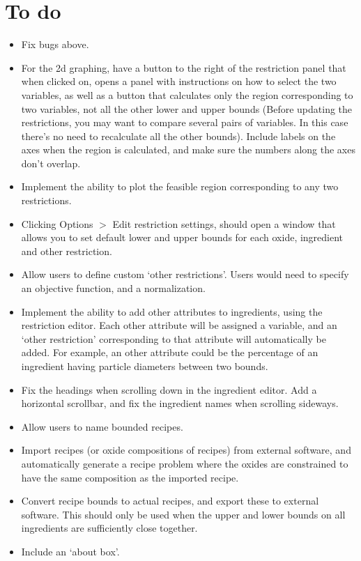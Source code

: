 \documentclass[a4paper,10pt]{article}
\begin{document}
\section{To do}
\begin{itemize}
\item Fix bugs above.
\item For the 2d graphing, have a button to the right of the restriction panel that when clicked on, opens a panel with instructions on how to select the two variables, as well as a button that calculates only the region corresponding to two variables, not all the other lower and upper bounds (Before updating the restrictions, you may want to compare several pairs of variables. In this case there's no need to recalculate all the other bounds). Include labels on the axes when the region is calculated, and make sure the numbers along the axes don't overlap. 
\item Implement the ability to plot the feasible region corresponding to any two restrictions.
\item Clicking Options $>$ Edit restriction settings, should open a window that allows you to set default lower and upper bounds for each oxide, ingredient and other restriction.
\item Allow users to define custom `other restrictions'. Users would need to specify an objective function, and a normalization.
\item Implement the ability to add other attributes to ingredients, using the restriction editor. Each other attribute will be assigned a variable, and an `other restriction' corresponding to that attribute will automatically be added. For example, an other attribute could be the percentage of an ingredient having particle diameters between two bounds.
\item Fix the headings when scrolling down in the ingredient editor. Add a horizontal scrollbar, and fix the ingredient names when scrolling sideways.
\item Allow users to name bounded recipes.
\item Import recipes (or oxide compositions of recipes) from external software, and automatically generate a recipe problem where the oxides are constrained to have the same composition as the imported recipe.
\item Convert recipe bounds to actual recipes, and export these to external software. This should only be used when the upper and lower bounds on all ingredients are sufficiently close together.
\item Include an `about box'. 
\end{itemize}
\end{document}
